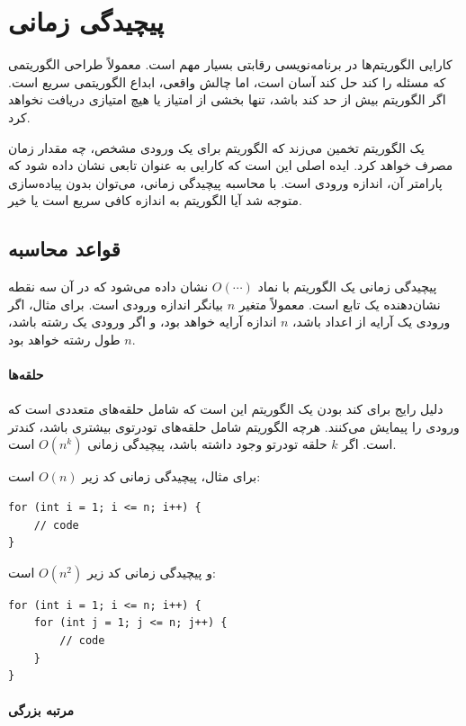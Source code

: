 \chapter{پیچیدگی زمانی}


کارایی الگوریتم‌ها در برنامه‌نویسی رقابتی بسیار مهم است.
معمولاً طراحی الگوریتمی که مسئله را کند حل کند آسان است،
اما چالش واقعی، ابداع الگوریتمی سریع است.
اگر الگوریتم بیش از حد کند باشد، تنها بخشی از امتیاز یا هیچ امتیازی دریافت نخواهد کرد.

 یک الگوریتم تخمین می‌زند که الگوریتم برای یک ورودی مشخص، چه مقدار زمان مصرف خواهد کرد.
ایده اصلی این است که کارایی به عنوان تابعی نشان داده شود که پارامتر آن، اندازه ورودی است.
با محاسبه پیچیدگی زمانی، می‌توان بدون پیاده‌سازی متوجه شد آیا الگوریتم به اندازه کافی سریع است یا خیر.

\section{قواعد محاسبه}

پیچیدگی زمانی یک الگوریتم با نماد $O(\cdots)$ نشان داده می‌شود
که در آن سه نقطه نشان‌دهنده یک تابع است.
معمولاً متغیر $n$ بیانگر اندازه ورودی است.
برای مثال، اگر ورودی یک آرایه از اعداد باشد،
$n$ اندازه آرایه خواهد بود،
و اگر ورودی یک رشته باشد،
$n$ طول رشته خواهد بود.

\subsubsection*{حلقه‌ها}

دلیل رایج برای کند بودن یک الگوریتم این است که شامل حلقه‌های متعددی است که ورودی را پیمایش می‌کنند.
هرچه الگوریتم شامل حلقه‌های تودرتوی بیشتری باشد، کندتر است.
اگر $k$ حلقه تودرتو وجود داشته باشد، پیچیدگی زمانی $O(n^k)$ است.

برای مثال، پیچیدگی زمانی کد زیر $O(n)$ است:
\begin{lstlisting}
for (int i = 1; i <= n; i++) {
    // code
}
\end{lstlisting}

و پیچیدگی زمانی کد زیر $O(n^2)$ است:
\begin{lstlisting}
for (int i = 1; i <= n; i++) {
    for (int j = 1; j <= n; j++) {
        // code
    }
}
\end{lstlisting}

\subsubsection*{مرتبه بزرگی}


